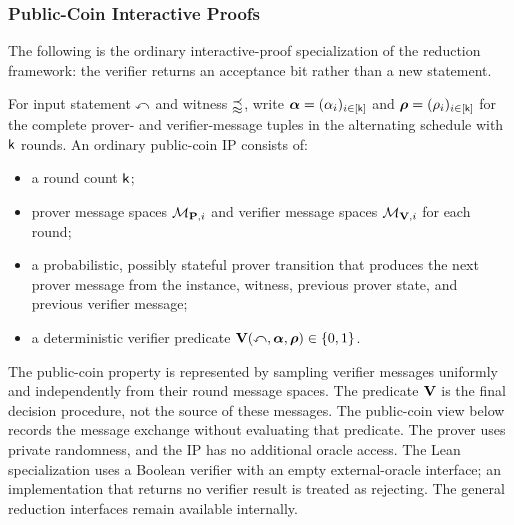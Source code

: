 \subsubsection{Public-Coin Interactive Proofs}

The following is the ordinary interactive-proof specialization of the reduction
framework: the verifier returns an acceptance bit rather than a new statement.

\begin{definition}
\label{def:public_coin_ip_structure}
For input statement \(\mathbb{x}\) and witness \(\mathbb{w}\), write \(\boldsymbol{\alpha}=(\alpha_{i})_{i\in[\mathsf{k}]}\) and \(\boldsymbol{\rho}=(\rho_{i})_{i\in[\mathsf{k}]}\) for the complete prover- and verifier-message tuples in the alternating schedule with \(\mathsf{k}\) rounds. An ordinary public-coin IP consists of:
\begin{itemize}
\item a round count \(\mathsf{k}\);
\item prover message spaces
\(\mathcal M_{\mathbf{P},i}\) and verifier message spaces
\(\mathcal M_{\mathbf{V},i}\) for each round;
\item a probabilistic, possibly stateful prover transition that produces the next prover
message from the instance, witness, previous prover state, and previous
verifier message;
\item a deterministic verifier predicate
\(\mathbf{V}(\mathbb{x},\boldsymbol{\alpha},\boldsymbol{\rho})\in\{0,1\}\).
\end{itemize}
The public-coin property is represented by sampling verifier messages
uniformly and independently from their round message spaces.
The predicate \(\mathbf{V}\) is the final decision procedure, not the source
of these messages. The public-coin view below records the message exchange
without evaluating that predicate.
The prover uses private randomness, and the IP has no additional oracle access.
The Lean specialization uses a Boolean verifier with an empty external-oracle
interface; an implementation that returns no verifier result is treated as rejecting.
The general reduction interfaces remain available internally.
\leanok
\end{definition}

